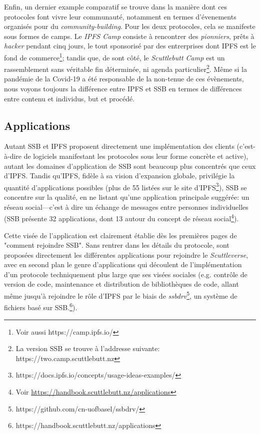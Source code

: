 \documentclass{article}
\begin{document}
Enfin, un dernier example comparatif se trouve dans la manière dont ces protocoles font vivre leur communauté, notamment en termes d'évenements organisés pour du \emph{community-building}. Pour les deux protocoles, cela se manifeste sous formes de camps. Le \emph{IPFS Camp} consiste à rencontrer des \emph{pionniers}, prêts à \emph{hacker} pendant cinq jours, le tout sponsorisé par des entrerprises dont IPFS est le fond de commerce\footnote{Voir aussi https://camp.ipfs.io/}; tandis que, de sont côté, le \emph{Scuttlebutt Camp} est un rassemblement sans véritable fin déterminée, ni agenda particulier\footnote{La version SSB se trouve à l'addresse suivante: https://two.camp.scuttlebutt.nz}. Même si la pandémie de la Covid-19 a été responsable de la non-tenue de ces évènements, nous voyons toujours la différence entre IPFS et SSB en termes de différences entre contenu et individus, but et procédé.

\subsection{Applications}

Autant SSB et IPFS proposent directement une implémentation des clients (c'est-à-dire de logiciels manifestant les protocoles sous leur forme concrète et active), autant les domaines d'application de SSB sont beaucoup plus concentrés que ceux d'IPFS. Tandis qu'IPFS, fidèle à sa vision d'expansion globale, privilégie la quantité d'applications possibles (plus de 55 listées sur le site d'IPFS\footnote{https://docs.ipfs.io/concepts/usage-ideas-examples/}), SSB se concentre sur la qualité, en ne listant qu'une application principale suggérée: un réseau social—c'est à dire un échange de messages entre personnes individuelles (SSB présente 32 applications, dont 13 autour du concept de réseau social\footnote{Voir \url{https://handbook.scuttlebutt.nz/applications}}).

Cette visée de l'application est clairement établie dès les premières pages de "comment rejoindre SSB". Sans rentrer dans les détails du protocole, sont proposées directement les différentes applications pour rejoindre le \emph{Scuttleverse}, avec en second plan le genre d'applications qui découlent de l'implémentation d'un protocole techniquement plus large que ses visées sociales (e.g. contrôle de version de code, maintenance et distribution de bibliothèques de code, allant même jusqu'à rejoindre le rôle d'IPFS par le biais de \emph{ssbdrv}\footnote{https://github.com/cn-uofbasel/ssbdrv/}, un système de fichiers basé sur SSB.\footnote{https://handbook.scuttlebutt.nz/applications}).
\end{document}

